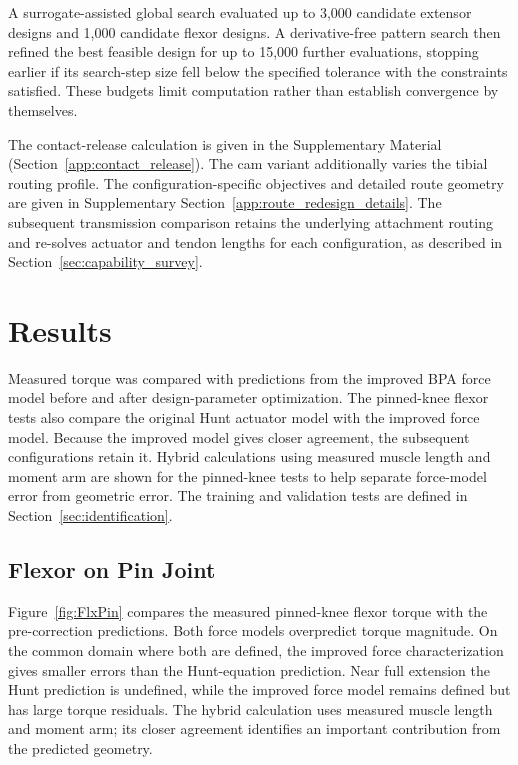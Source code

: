 \documentclass[utf8]{FrontiersinHarvard} %
\begin{document}
A surrogate-assisted global search evaluated up to 3,000 candidate extensor designs and 1,000 candidate flexor designs. A derivative-free pattern search then refined the best feasible design for up to 15,000 further evaluations, stopping earlier if its search-step size fell below the specified tolerance with the constraints satisfied. These budgets limit computation rather than establish convergence by themselves.

The contact-release calculation is given in the Supplementary Material (Section~\ref{app:contact_release}). The cam variant additionally varies the tibial routing profile. The configuration-specific objectives and detailed route geometry are given in Supplementary Section~\ref{app:route_redesign_details}. The subsequent transmission comparison retains the underlying attachment routing and re-solves actuator and tendon lengths for each configuration, as described in Section~\ref{sec:capability_survey}.





\section{Results}\label{sec:results_torque}

Measured torque was compared with predictions from the improved BPA force model before and after design-parameter optimization. The pinned-knee flexor tests also compare the original Hunt actuator model with the improved force model. Because the improved model gives closer agreement, the subsequent configurations retain it. Hybrid calculations using measured muscle length and moment arm are shown for the pinned-knee tests to help separate force-model error from geometric error. The training and validation tests are defined in Section~\ref{sec:identification}.

\subsection{Flexor on Pin Joint}

Figure~\ref{fig:FlxPin} compares the measured pinned-knee flexor torque with the pre-correction predictions. Both force models overpredict torque magnitude. On the common domain where both are defined, the improved force characterization gives smaller errors than the Hunt-equation prediction. Near full extension the Hunt prediction is undefined, while the improved force model remains defined but has large torque residuals. The hybrid calculation uses measured muscle length and moment arm; its closer agreement identifies an important contribution from the predicted geometry.
\end{document}
